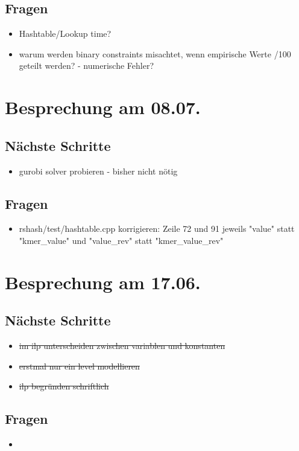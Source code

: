 \documentclass{article}
\begin{document}
	\subsection*{Fragen}
	\begin{itemize}
			\item Hashtable/Lookup time? 
			\item warum werden binary constraints misachtet, wenn empirische Werte /100 geteilt werden? - numerische Fehler?
		\end{itemize}

\section*{Besprechung am 08.07.}
\subsection*{Nächste Schritte}
	\begin{itemize}
			\item  gurobi solver probieren - bisher nicht nötig
		\end{itemize}
	\subsection*{Fragen}
	\begin{itemize}
			\item rshash/test/hashtable.cpp korrigieren: Zeile 72 und 91 jeweils "value" statt "kmer\_value" und "value\_rev" statt "kmer\_value\_rev"
		\end{itemize}

\section*{Besprechung am 17.06.}
\subsection*{Nächste Schritte}
	\begin{itemize}
			\item \sout{im ilp unterscheiden zwischen variablen und konstanten} 
			\item \sout{erstmal nur ein level modellieren}
			\item \sout{ilp begründen schriftlich}
		\end{itemize}
	\subsection*{Fragen}
	\begin{itemize}
			\item 
		\end{itemize}
\end{document}
